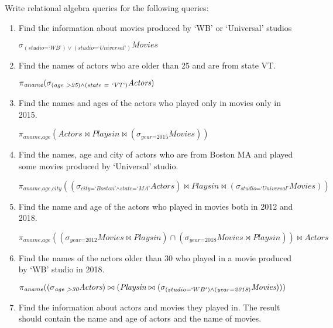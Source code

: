 \documentclass[letterpaper, 11pt]{article}
\begin{document}
Write relational algebra queries for the following queries:
\begin{enumerate}[label={\alph*})]
    \item Find the information about movies produced by `WB' or `Universal' studios
    
    $\sigma_{(\textit{studio=`WB'}) \vee (\textit{studio=`Universal'})}\textit{Movies}$
    
    \item Find the names of actors who are older than 25 and are from state VT.

    $\pi_{\textit{aname}}(\sigma_{(\textit{age \textgreater 25}) \wedge (\textit{state = `VT'})}\textit{Actors})$
    
    \item Find the names and ages of the actors who played only in movies only in 2015.

    $\pi_{\textit{aname,age}}(\textit{Actors} \bowtie \textit{Playsin} \bowtie (\sigma_{\textit{year=2015}}\textit{Movies}))$
    
    \item Find the names, age and city of actors who are from Boston MA and played some movies produced by `Universal' studio.

    $\pi_{\textit{aname,age,city}}((\sigma_{\textit{city=`Boston'}\wedge \textit{state=`MA'}}\textit{Actors}) \bowtie \textit{Playsin} \bowtie (\sigma_{\textit{studio=`Universal'}}\textit{Movies}))$
    
    \item Find the name and age of the actors who played in movies both in 2012 and 2018.

    $\pi_{\textit{aname,age}}((\sigma_{\textit{year=2012}}\textit{Movies} \bowtie \textit{Playsin}) \cap (\sigma_{\textit{year=2018}}\textit{Movies} \bowtie \textit{Playsin})) \bowtie \textit{Actors}$
    
    \item Find the names of the actors older than 30 who played in a movie produced by `WB' studio in 2018.

    $\pi_{\textit{aname}}((\sigma_{\textit{age \textgreater 30}}\textit{Actors}) \bowtie (\textit{Playsin} \bowtie (\sigma_{(studio=`WB') \wedge (\textit{year=2018})}\textit{Movies})))$
    
    \item Find the information about actors and movies they played in. The result should contain the name and age of actors and the name of movies.


\end{enumerate}
\end{document}
